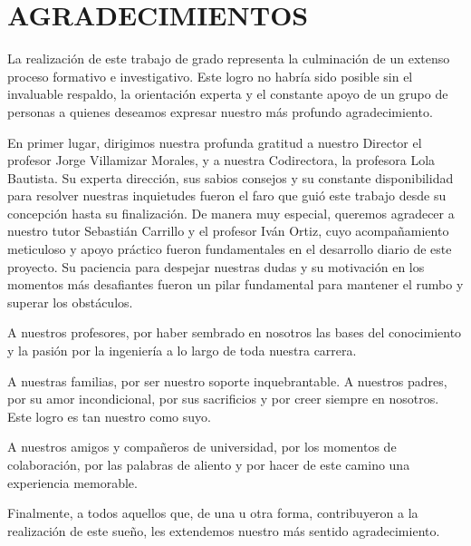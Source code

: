 \chapter*{AGRADECIMIENTOS}

La realización de este trabajo de grado representa la culminación de un extenso proceso
formativo e investigativo. Este logro no habría sido posible sin el invaluable respaldo,
la orientación experta y el constante apoyo de un grupo de personas a quienes deseamos
expresar nuestro más profundo agradecimiento.

En primer lugar, dirigimos nuestra profunda gratitud a nuestro Director el profesor Jorge
Villamizar Morales, y a nuestra Codirectora, la profesora Lola Bautista. Su experta
dirección, sus sabios consejos y su constante disponibilidad para resolver nuestras
inquietudes fueron el faro que guió este trabajo desde su concepción hasta su
finalización. De manera muy especial, queremos agradecer a nuestro tutor Sebastián
Carrillo y el profesor Iván Ortiz, cuyo acompañamiento meticuloso y apoyo práctico fueron
fundamentales en el desarrollo diario de este proyecto. Su paciencia para despejar
nuestras dudas y su motivación en los momentos más desafiantes fueron un pilar fundamental
para mantener el rumbo y superar los obstáculos.

A nuestros profesores, por haber sembrado en nosotros las bases del conocimiento y la
pasión por la ingeniería a lo largo de toda nuestra carrera.

A nuestras familias, por ser nuestro soporte inquebrantable. A nuestros padres, por su
amor incondicional, por sus sacrificios y por creer siempre en nosotros. Este logro es tan
nuestro como suyo.

A nuestros amigos y compañeros de universidad, por los momentos de colaboración, por las
palabras de aliento y por hacer de este camino una experiencia memorable.

Finalmente, a todos aquellos que, de una u otra forma, contribuyeron a la realización de
este sueño, les extendemos nuestro más sentido agradecimiento.
\newpage